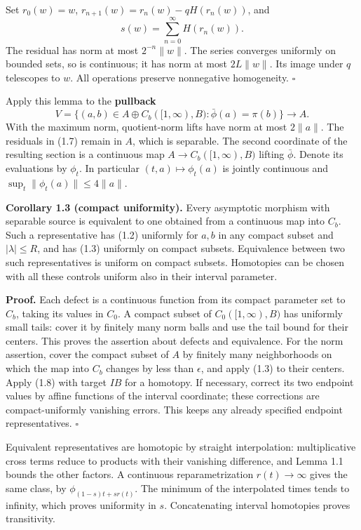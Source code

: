 \documentclass[
  11pt,
]{article}
\begin{document}
Set \(r_0(w)=w\), \(r_{n+1}(w)=r_n(w)-qH(r_n(w))\), and \[
s(w)=\sum_{n=0}^\infty H(r_n(w)).
\tag{1.7}
\] The residual has norm at most \(2^{-n}\|w\|\). The series converges
uniformly on bounded sets, so is continuous; it has norm at most
\(2L\|w\|\). Its image under \(q\) telescopes to \(w\). All operations
preserve nonnegative homogeneity. \(\square\)

Apply this lemma to the \textbf{pullback} \[
V=\{(a,b)\in A\oplus C_b([1,\infty),B):\bar\phi(a)=\pi(b)\}
\longrightarrow A.
\tag{1.8}
\] With the maximum norm, quotient-norm lifts have norm at most
\(2\|a\|\). The residuals in (1.7) remain in \(A\), which is separable.
The second coordinate of the resulting section is a continuous map
\(A\to C_b([1,\infty),B)\) lifting \(\bar\phi\). Denote its evaluations
by \(\phi_t\). In particular \((t,a)\mapsto\phi_t(a)\) is jointly
continuous and \(\sup_t\|\phi_t(a)\|\leq4\|a\|\).

\textbf{Corollary 1.3 (compact uniformity).} Every asymptotic morphism
with separable source is equivalent to one obtained from a continuous
map into \(C_b\). Such a representative has (1.2) uniformly for \(a,b\)
in any compact subset and \(|\lambda|\leq R\), and has (1.3) uniformly
on compact subsets. Equivalence between two such representatives is
uniform on compact subsets. Homotopies can be chosen with all these
controls uniform also in their interval parameter.

\textbf{Proof.} Each defect is a continuous function from its compact
parameter set to \(C_b\), taking its values in \(C_0\). A compact subset
of \(C_0([1,\infty),B)\) has uniformly small tails: cover it by finitely
many norm balls and use the tail bound for their centers. This proves
the assertion about defects and equivalence. For the norm assertion,
cover the compact subset of \(A\) by finitely many neighborhoods on
which the map into \(C_b\) changes by less than \(\epsilon\), and apply
(1.3) to their centers. Apply (1.8) with target \(IB\) for a homotopy.
If necessary, correct its two endpoint values by affine functions of the
interval coordinate; these corrections are compact-uniformly vanishing
errors. This keeps any already specified endpoint representatives.
\(\square\)

Equivalent representatives are homotopic by straight interpolation:
multiplicative cross terms reduce to products with their vanishing
difference, and Lemma 1.1 bounds the other factors. A continuous
reparametrization \(r(t)\to\infty\) gives the same class, by
\(\phi_{(1-s)t+sr(t)}\). The minimum of the interpolated times tends to
infinity, which proves uniformity in \(s\). Concatenating interval
homotopies proves transitivity.
\end{document}

